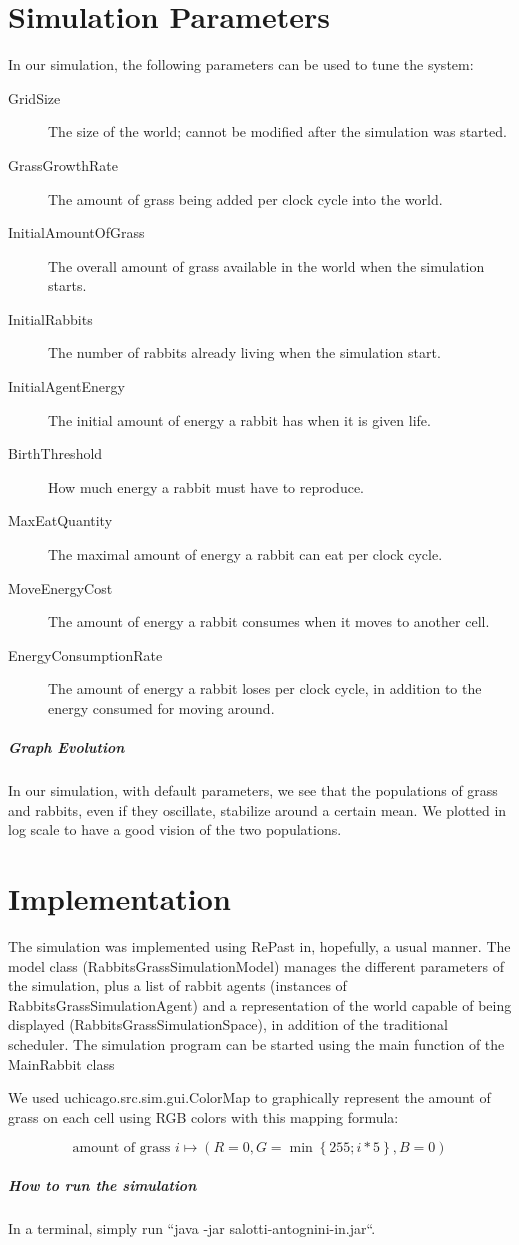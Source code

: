 \documentclass[12pt]{article}
\begin{document}
\section*{Simulation Parameters}

In our simulation, the following parameters can be used to tune the system:

\begin{description}
	\item[GridSize] The size of the world; cannot be modified after the simulation was started.
    \item[GrassGrowthRate] The amount of grass being added per clock cycle into the world.
    \item[InitialAmountOfGrass] The overall amount of grass available in the world when the simulation starts.
    \item[InitialRabbits] The number of rabbits already living when the simulation start.
    \item[InitialAgentEnergy] The initial amount of energy a rabbit has when it is given life.
    \item[BirthThreshold] How much energy a rabbit must have to reproduce.
    \item[MaxEatQuantity] The maximal amount of energy a rabbit can eat per clock cycle.
    \item[MoveEnergyCost] The amount of energy a rabbit consumes when it moves to another cell.
    \item[EnergyConsumptionRate] The amount of energy a rabbit loses per clock cycle, in addition to the energy consumed for moving around.
\end{description}

\subparagraph{Graph Evolution}
In our simulation, with default parameters, we see that the populations of grass and rabbits, even if they oscillate, stabilize around a certain mean. We plotted in log scale to have a good vision of the two populations.

\section*{Implementation}

The simulation was implemented using RePast in, hopefully, a usual manner. The model class (RabbitsGrassSimulationModel) manages the different parameters of the simulation, plus a list of rabbit agents (instances of RabbitsGrassSimulationAgent) and a representation of the world capable of being displayed (RabbitsGrassSimulationSpace), in addition of the traditional scheduler. The simulation program can be started using the main function of the MainRabbit class

We used uchicago.src.sim.gui.ColorMap to graphically represent the amount of grass on each cell using RGB colors with this mapping formula:

\[
\mbox{amount of grass } i \mapsto \left( R = 0, G = \min \left\{ 255; i * 5 \right\}, B = 0 \right)
\]


\subparagraph*{How to run the simulation}

In a terminal, simply run ``java -jar salotti-antognini-in.jar``.
\end{document}
